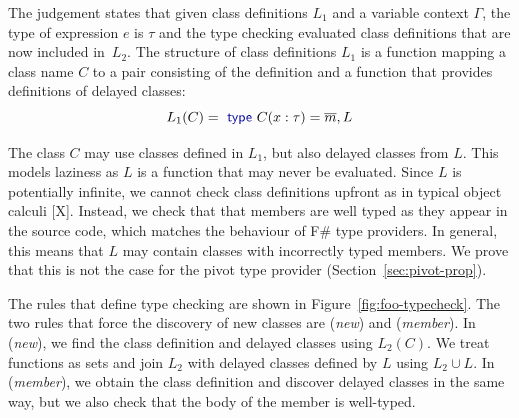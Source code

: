 \documentclass[a4paper,UKenglish]{lipics-v2016}
\theoremstyle{plain}
\theoremstyle{definition}
\newcommand{\kvd}[1]{\textnormal{\textcolor{kvdclr}{\sffamily #1}}}
\begin{document}
\noindent
The judgement states that given class definitions $L_1$ and a variable context $\Gamma$, the type
of expression $e$ is $\tau$ and the type checking evaluated class definitions that are
now included in~$L_2$. The structure of class definitions $L_1$ is a function mapping a class name 
$C$ to a pair consisting of the definition and a function that provides definitions of 
delayed classes: 
%
\begin{equation*}
L_1(C) = \kvd{type}~C(x:\tau) = \overline{m}, L
\end{equation*}

\noindent
The class $C$ may use classes defined in $L_1$, but also delayed classes from $L$. This models 
laziness as $L$ is a function that may never be evaluated. Since $L$ is potentially infinite, we 
cannot check class definitions upfront as in typical object calculi [X]. Instead, we check that 
that members are well typed as they appear in the source code, which matches the behaviour of F\# 
type providers. In general, this means that $L$ may contain classes with incorrectly typed 
members. We prove that this is not the case for the pivot type provider (Section~\ref{sec:pivot-prop}).

The rules that define type checking are shown in Figure~\ref{fig:foo-typecheck}. The two rules
that force the discovery of new classes are (\emph{new}) and (\emph{member}). In (\emph{new}), we
find the class definition and delayed classes using $L_2(C)$. We treat functions as sets and 
join $L_2$ with delayed classes defined by $L$ using $L_2 \cup L$. In (\emph{member}), we obtain
the class definition and discover delayed classes in the same way, but we also check that the body
of the member is well-typed.

\end{document}
